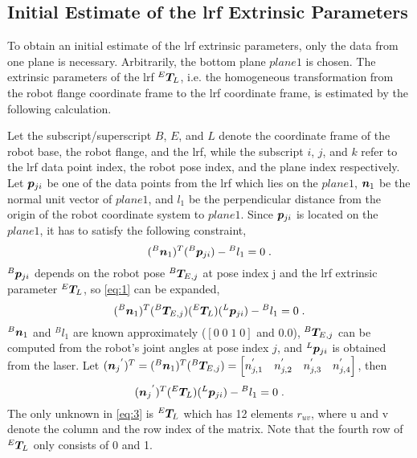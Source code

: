 \subsection{Initial Estimate of the \ac{lrf} Extrinsic Parameters}
\label{sec:first_step}
To obtain an initial estimate of the \ac{lrf} extrinsic parameters, only the data from one plane is necessary. Arbitrarily, the bottom plane $plane 1$ is chosen. The extrinsic parameters of the \ac{lrf} ${^E}\vb*{T}_L$, i.e. the homogeneous transformation from the robot flange coordinate frame to the \ac{lrf} coordinate frame, is estimated by the following calculation. 

Let the subscript/superscript $B$, $E$, and $L$ denote the coordinate frame of the robot base, the robot flange, and the \ac{lrf}, while the subscript $i$, $j$, and $k$ refer to the \ac{lrf} data point index, the robot pose index, and the plane index respectively. Let $\vb*{p}_{ji}$ be one of the data points from the \ac{lrf} which lies on the $plane 1$, $\vb*{n}_1$ be the normal unit vector of $plane 1$, and $l_1$ be the perpendicular distance from the origin of the robot coordinate system to $plane 1$.  Since $\vb*{p}_{ji}$ is located on the $plane 1$, it has to satisfy the following constraint, 
  \begin{equation}
  \label{eq:1}
  ({^B}\vb*{n}_1) ^T ({^B}\vb*{p}_{ji}) - {^B}l_1 = 0 \; .
   \end{equation}
${^B}\vb*{p}_{ji}$ depends on the robot pose ${^B}\vb*{T}_{E,j}$ at pose index j and the \ac{lrf} extrinsic parameter ${^E}\vb*{T}_L$, so \eqref{eq:1}  can be expanded,
  \begin{equation}
  ({^B}\vb*{n}_1) ^T ({^B}\vb*{T}_{E,j}) ({^E}\vb*{T}_L) ({^L}\vb*{p}_{ji}) - {^B}l_1 = 0 \; .
  \end{equation}
${^B}\vb*{n}_1$ and $^{B}l_1$ are known approximately ($[0 \; 0\; 1\;0]$ and $0.0$), ${^B}\vb*{T}_{E,j}$ can be computed from the robot's joint angles at pose index $j$, and ${^L}\vb*{p}_{ji}$ is obtained from the laser. Let $({\vb*{n}_j}^{'})^{T} = ({^B}\vb*{n}_1) ^T ({^B}\vb*{T}_{E,j}) = 
\left[n^{'}_{j,1} \quad n^{'}_{j,2} \quad n^{'}_{j,3}  \quad n^{'}_{j,4} \right]$, then  
  \begin{equation}
  \label{eq:3}
  ({\vb*{n}_j}^{'}) ^T ({^E}\vb*{T}_L) ({^L}\vb*{p}_{ji}) - {^B}l_1 = 0 \; .
  \end{equation}
The only unknown in \eqref{eq:3} is ${^E}\vb*{T}_L$ which has 12 elements $r_{uv}$, where u and v denote the column and the row index of the matrix. Note that the fourth row of ${^E}\vb*{T}_L$ only consists of 0 and 1. 
